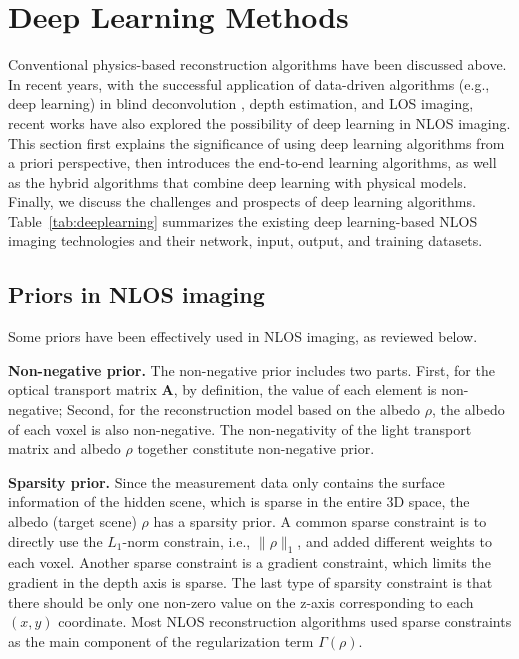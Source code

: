 \section{Deep Learning Methods} \label{sec4}
Conventional physics-based reconstruction algorithms have been discussed above. In recent years, with the successful application of data-driven algorithms (e.g., deep learning\cite{lecunDeepLearning2015}) in blind deconvolution \cite{kupynDeblurGANBlindMotion2018}, depth estimation\cite{eigen_depth_2014}, and LOS imaging\cite{lindellSinglephoton3DImaging2018,su_deep_2018,marco_deeptof_2017}, recent works have also explored the possibility of deep learning in NLOS imaging. This section first explains the significance of using deep learning algorithms from a priori perspective, then introduces the end-to-end learning algorithms, as well as the hybrid algorithms that combine deep learning with physical models. Finally, we discuss the challenges and prospects of deep learning algorithms. 
Table~\ref{tab:deeplearning} summarizes the existing deep learning-based NLOS imaging technologies and their network, input, output, and training datasets.

\subsection{Priors in NLOS imaging}
\label{sec:PriorsinNLOS}
Some priors have been effectively used in NLOS imaging, as reviewed below.


\vspace{0.8em}
\noindent\textbf{Non-negative prior.}
The non-negative prior includes two parts. First, for the optical transport matrix $\mathbf{A}$, by definition, the value of each element is non-negative; Second, for the reconstruction model based on the albedo $\rho$, the albedo of each voxel is also non-negative. The non-negativity of the light transport matrix and albedo $\rho$ together constitute non-negative prior.

\vspace{0.8em}
\noindent\textbf{Sparsity prior.}
Since the measurement data only contains the surface information of the hidden scene, which is sparse in the entire 3D space, the albedo (target scene) $\rho$ has a sparsity prior. A common sparse constraint is to directly use the $L_1$-norm constrain, i.e., $\|\rho\|_{1}$, and \cite{heideDiffuseMirrors3D2014} added different weights to each voxel. Another sparse constraint is a gradient constraint, which limits the gradient in the depth axis is sparse. The last type of sparsity constraint is that there should be only one non-zero value on the z-axis corresponding to each $(x, y)$ coordinate\cite{heideDiffuseMirrors3D2014}. Most NLOS reconstruction algorithms used sparse constraints as the main component of the regularization term $\Gamma(\rho)$\cite{heideNonlineofsightImagingPartial2017,Young:2020:dlct}.

